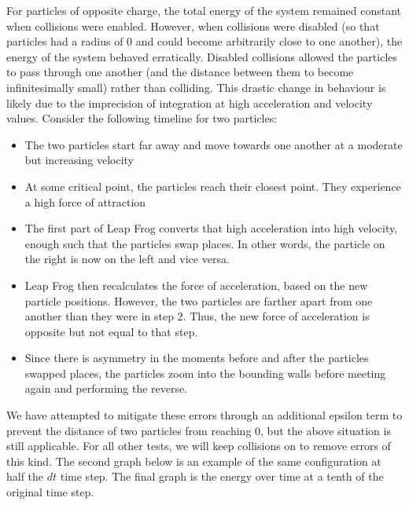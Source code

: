 \documentclass{article}
\begin{document}
For particles of opposite charge, the total energy of the system remained constant when collisions were enabled.
However, when collisions were disabled (so that particles had a radius of 0 and could become arbitrarily close to one another),
the energy of the system behaved erratically.
Disabled collisions allowed
the particles to pass through one another (and the distance between them to become infinitesimally small) rather than colliding.
This drastic change in behaviour is likely due to the imprecision of integration at high acceleration and velocity values.
Consider the following timeline for two particles:
\begin{itemize}
    \item The two particles start far away and move towards one another at a moderate but increasing velocity
    \item At some critical point, the particles reach their closest point. They experience a high force of attraction
    \item The first part of Leap Frog converts that high acceleration into high velocity, enough such that the particles swap places.
    In other words, the particle on the right is now on the left and vice versa.
    \item Leap Frog then recalculates the force of acceleration, based on the new particle positions.
    However, the two particles are farther apart from one another than they were in step 2.
    Thus, the new force of acceleration is opposite but not equal to that step.
    \item Since there is asymmetry in the moments before and after the particles swapped places,
    the particles zoom into the bounding walls before meeting again and performing the reverse.
\end{itemize}
We have attempted to mitigate these errors through an additional epsilon term to prevent the distance of two particles from reaching 0,
but the above situation is still applicable.
For all other tests, we will keep collisions on to remove errors of this kind.
The second graph below is an example of the same configuration at half the $dt$ time step.
The final graph is the energy over time at a tenth of the original time step.
\\
\end{document}
